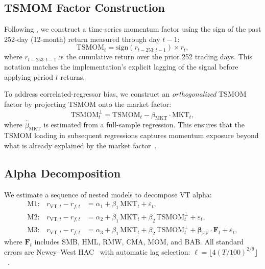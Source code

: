 \subsection{TSMOM Factor Construction}

Following \citet{moskowitz2012}, we construct a time-series momentum factor using the sign of the past 252-day (12-month) return measured through day $t-1$:
\begin{equation}
\text{TSMOM}_t = \text{sign}(r_{t-253:t-1}) \times r_t,
\label{eq:tsmom}
\end{equation}
where $r_{t-253:t-1}$ is the cumulative return over the prior 252 trading days. This notation matches the implementation's explicit lagging of the signal before applying period-$t$ returns.

To address correlated-regressor bias, we construct an \textit{orthogonalized} TSMOM factor by projecting TSMOM onto the market factor:
\begin{equation}
\text{TSMOM}_t^{\perp} = \text{TSMOM}_t - \hat{\beta}_{\text{MKT}} \cdot \text{MKT}_t,
\label{eq:tsmom_orth}
\end{equation}
where $\hat{\beta}_{\text{MKT}}$ is estimated from a full-sample regression. This ensures that the TSMOM loading in subsequent regressions captures momentum exposure beyond what is already explained by the market factor~\citep{hood2025}.

\subsection{Alpha Decomposition}

We estimate a sequence of nested models to decompose VT alpha:
\begin{align}
\text{M1:} \quad r_{\text{VT},t} - r_{f,t} &= \alpha_1 + \beta_1 \, \text{MKT}_t + \varepsilon_t, \label{eq:m1} \\
\text{M2:} \quad r_{\text{VT},t} - r_{f,t} &= \alpha_2 + \beta_1 \, \text{MKT}_t + \beta_2 \, \text{TSMOM}_t^{\perp} + \varepsilon_t, \label{eq:m2} \\
\text{M3:} \quad r_{\text{VT},t} - r_{f,t} &= \alpha_3 + \beta_1 \, \text{MKT}_t + \beta_2 \, \text{TSMOM}_t^{\perp} + \boldsymbol{\beta}_{\text{FF}} \cdot \mathbf{F}_t + \varepsilon_t, \label{eq:m3}
\end{align}
where $\mathbf{F}_t$ includes SMB, HML, RMW, CMA, MOM, and BAB. All standard errors are Newey--West HAC~\citep{newey1987} with automatic lag selection: $\ell = \lfloor 4(T/100)^{2/9} \rfloor$~\citep{newey1994}.

